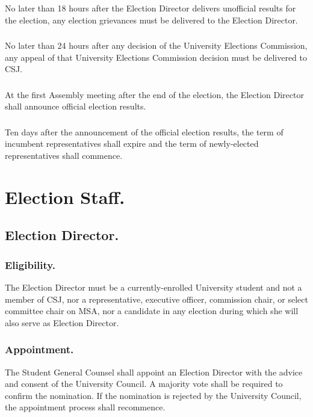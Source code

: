 \subsubsection{}
No later than 18 hours after the Election Director delivers unofficial results for the election, any election grievances must be delivered to the Election Director.
\subsubsection{}
No later than 24 hours after any decision of the University Elections Commission, any appeal of that University Elections Commission decision must be delivered to CSJ.
\subsubsection{}
At the first Assembly meeting after the end of the election, the Election Director shall announce official election results.
\subsubsection{}
Ten days after the announcement of the official election results, the term of incumbent representatives shall expire and the term of newly-elected representatives shall commence. 


\section{Election Staff.}

\subsection{Election Director.}

\subsubsection{Eligibility.}
The Election Director must be a currently-enrolled University student and not a member of CSJ, nor a representative, executive officer, commission chair, or select committee chair on MSA, nor a candidate in any election during which she will also serve as Election Director.
\subsubsection{Appointment.}
The Student General Counsel shall appoint an Election Director with the advice and consent of the University Council.  A majority vote shall be required to confirm the nomination.  If the nomination is rejected by the University Council, the appointment process shall recommence.  
